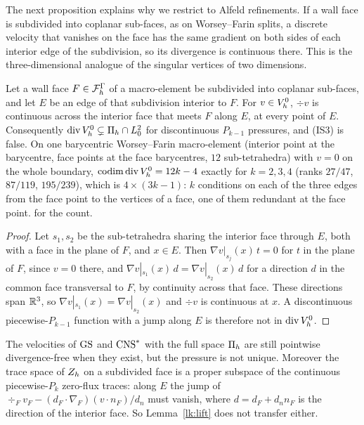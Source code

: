 The next proposition explains why we restrict to Alfeld refinements. If a wall face is subdivided into coplanar sub-faces, as on Worsey--Farin splits, a discrete velocity that vanishes on the face has the same gradient on both sides of each interior edge of the subdivision, so its divergence is continuous there. This is the three-dimensional analogue of the singular vertices of two dimensions.

\begin{proposition}\label{st:wf}
Let a wall face $F\in\mathcal F_h^\Gamma$ of a macro-element be subdivided into coplanar sub-faces, and let $E$ be an edge of that subdivision interior to $F$. For $v\in V_h^0$, $\div v$ is continuous across the interior face that meets $F$ along $E$, at every point of $E$. Consequently $\operatorname{div}V_h^0\subsetneq\Pi_h\cap L^2_0$ for discontinuous $P_{k-1}$ pressures, and (IS3) is false. On one barycentric Worsey--Farin macro-element (interior point at the barycentre, face points at the face barycentres, $12$ sub-tetrahedra) with $v=0$ on the whole boundary, $\operatorname{codim}\operatorname{div}V_h^0=12k-4$ exactly for $k=2,3,4$ (ranks $27/47$, $87/119$, $195/239$), which is $4\times(3k-1)$: $k$ conditions on each of the three edges from the face point to the vertices of a face, one of them redundant at the face point.  for the count.
\end{proposition}
\begin{proof}
Let $s_1,s_2$ be the sub-tetrahedra sharing the interior face through $E$, both with a face in the plane of $F$, and $x\in E$. Then $\nabla v|_{s_j}(x)\,t=0$ for $t$ in the plane of $F$, since $v=0$ there, and $\nabla v|_{s_1}(x)\,d=\nabla v|_{s_2}(x)\,d$ for a direction $d$ in the common face transversal to $F$, by continuity across that face. These directions span $\mathbb R^3$, so $\nabla v|_{s_1}(x)=\nabla v|_{s_2}(x)$ and $\div v$ is continuous at $x$. A discontinuous piecewise-$P_{k-1}$ function with a jump along $E$ is therefore not in $\operatorname{div}V_h^0$.
\end{proof}
The velocities of $\mathrm{GS}$ and $\mathrm{CNS}^\ast$ with the full space $\Pi_h$ are still pointwise divergence-free when they exist, but the pressure is not unique. Moreover the trace space of $Z_h$ on a subdivided face is a proper subspace of the continuous piecewise-$P_k$ zero-flux traces: along $E$ the jump of $\div_Fv_F-(d_F\cdot\nabla_F)(v\cdot n_F)/d_n$ must vanish, where $d=d_F+d_nn_F$ is the direction of the interior face. So Lemma~\ref{lk:lift} does not transfer either.

